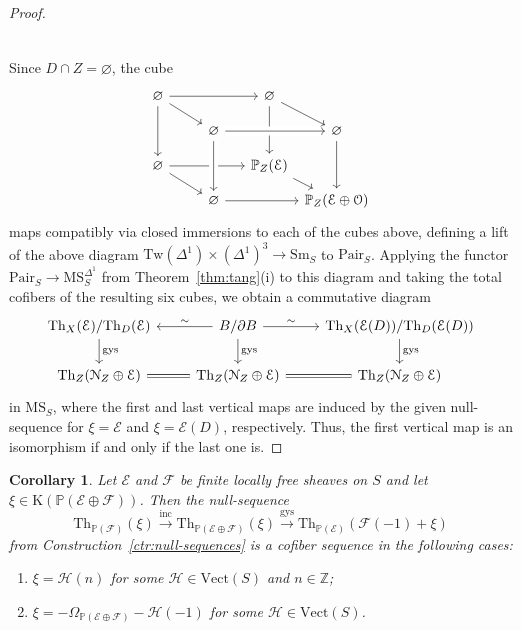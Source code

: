 \documentclass{amsart}
\numberwithin{equation}{section}
\theoremstyle{plain}
\newtheorem{corollary}[equation]{Corollary}
\theoremstyle{definition}
\let\scr=\mathcal
\let\bb=\mathbb
\def\Z{\bb Z}
\def\P{\bb P}
\let\emptyset=\varnothing
\def\Th{\mathrm{Th}}
\let\cat=\mathrm
\def\K{\mathrm{K}{}}
\def\Sm{{\cat{S}\mathrm{m}}}
\def\Vect{\cat{V}\mathrm{ect}{}}
\def\Pair{\mathrm{Pair}}
\def\MS{\mathrm{MS}}
\def\Tw{\mathrm{Tw}{}}
\def\gys{\mathrm{gys}{}}
\begin{document}
\begin{proof}
\begin{gather*}
\begin{tikzcd}[row sep={25,between origins}, column sep={40,between origins}, ampersand replacement=\&]
	\end{tikzcd}
	\end{gather*}
	Since $D\cap Z=\emptyset$, the cube 
	\[
	\begin{tikzcd}[row sep={25,between origins}, column sep={40,between origins}]
		\emptyset \ar{rr} \ar{dr} \ar{dd} && \emptyset \ar{dr} \ar{dd} \\
		& \emptyset \ar[crossing over]{rr} & & \emptyset \ar{dd}  \\
		\emptyset \ar{rr} \ar{dr} && \P_Z(\scr E) \ar{dr} \\
		& \emptyset \ar{rr} \ar[from=uu,crossing over] & & \P_Z(\scr E\oplus\scr O)
	\end{tikzcd}
	\]
	maps compatibly via closed immersions to each of the cubes above, defining a lift of the above diagram $\Tw(\Delta^1)\times(\Delta^1)^3\to \Sm_S$ to $\Pair_S$.	
	Applying the functor $\Pair_S\to\MS_S^{\Delta^1}$ from Theorem~\ref{thm:tang}(i) to this diagram and taking the total cofibers of the resulting six cubes, we obtain a commutative diagram
	\[
	\begin{tikzcd}
		\Th_X(\scr E)/\Th_D(\scr E) \ar{d}{\gys} & B/\partial B \ar{l}[swap]{\sim} \ar{r}{\sim} \ar{d}{\gys} & \Th_X(\scr E(D))/\Th_D(\scr E(D)) \ar{d}{\gys} \\
		\Th_Z(\scr N_Z\oplus\scr E) & \Th_Z(\scr N_Z\oplus\scr E) \ar[equal]{l} \ar[equal]{r} & \Th_Z(\scr N_Z\oplus\scr E)
	\end{tikzcd}
	\]
	in $\MS_S$, where the first and last vertical maps are induced by the given null-sequence for $\xi=\scr E$ and $\xi=\scr E(D)$, respectively. Thus, the first vertical map is an isomorphism if and only if the last one is.
\end{proof}

\begin{corollary}\label{cor:gys-cofib}
	Let $\scr E$ and $\scr F$ be finite locally free sheaves on $S$ and let $\xi\in\K(\P(\scr E \oplus\scr F))$. Then the null-sequence 
	\[
	\Th_{\P(\scr F)}(\xi) \xrightarrow{\mathrm{inc}} \Th_{\P(\scr E\oplus\scr F)}(\xi) \xrightarrow{\gys} \Th_{\P(\scr E)}(\scr F(-1)+\xi)
	\]
	from Construction~\ref{ctr:null-sequences} is a cofiber sequence in the following cases:
	\begin{enumerate}
		\item $\xi=\scr H(n)$ for some $\scr H\in \Vect(S)$ and $n\in\Z$;
		\item $\xi=-\Omega_{\P(\scr E\oplus\scr F)}-\scr H(-1)$ for some $\scr H\in\Vect(S)$.
	\end{enumerate}
\end{corollary}
\end{document}
